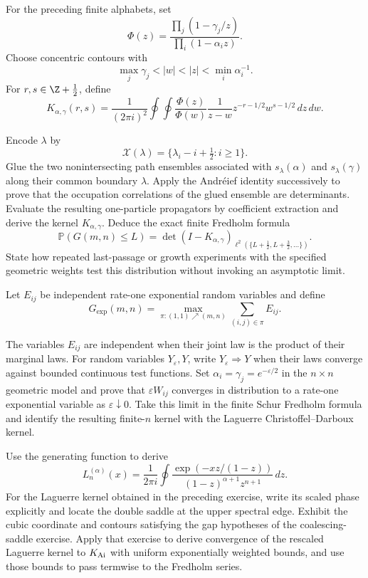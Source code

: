 \begin{exercise}
For the preceding finite alphabets, set
\[
\Phi(z)=\frac{\prod_j(1-\gamma_j/z)}
{\prod_i(1-\alpha_i z)}.
\]
Choose concentric contours with
\[
\max_j\gamma_j<|w|<|z|<\min_i\alpha_i^{-1}.
\]
For $r,s\in\Z+\tfrac12$, define
\[
K_{\alpha,\gamma}(r,s)
=\frac1{(2\pi i)^2}\oint\!\oint
\frac{\Phi(z)}{\Phi(w)}\frac{1}{z-w}
z^{-r-1/2}w^{s-1/2}\,dz\,dw.
\]

Encode $\lambda$ by
\[
\mathcal X(\lambda)
=\{\lambda_i-i+\tfrac12:i\geq1\}.
\]
Glue the two nonintersecting path ensembles associated with
$s_\lambda(\alpha)$ and $s_\lambda(\gamma)$ along their common boundary
$\lambda$.  Apply the Andr\'eief identity successively to prove that the
occupation correlations of the glued ensemble are determinants.  Evaluate
the resulting one-particle propagators by coefficient extraction and derive
the kernel $K_{\alpha,\gamma}$.  Deduce the exact finite Fredholm formula
\[
\mathbb P(G(m,n)\leq L)
=\det(I-K_{\alpha,\gamma})_{
\ell^2(\{L+\tfrac12,L+\tfrac32,\ldots\})}.
\]
State how repeated last-passage or growth experiments with the specified
geometric weights test this distribution without invoking an asymptotic
limit.
\end{exercise}

\begin{exercise}
Let $E_{ij}$ be independent rate-one exponential random variables and define
\[
G_{\exp}(m,n)=\max_{\pi:(1,1)\nearrow(m,n)}
\sum_{(i,j)\in\pi}E_{ij}.
\]

The variables $E_{ij}$ are independent when their joint law is the product
of their marginal laws.
For random variables $Y_\varepsilon,Y$, write $Y_\varepsilon\Longrightarrow Y$
when their laws converge against bounded continuous test functions.
Set $\alpha_i=\gamma_j=e^{-\varepsilon/2}$ in the $n\times n$ geometric
model and prove that $\varepsilon W_{ij}$ converges in distribution to a
rate-one exponential variable as $\varepsilon\downarrow0$.  Take this limit
in the finite Schur Fredholm formula and identify the resulting finite-$n$
kernel with the Laguerre Christoffel--Darboux kernel.
\end{exercise}

\begin{exercise}
Use the generating function to derive
\[
L_n^{(\alpha)}(x)
=\frac1{2\pi i}\oint
\frac{\exp(-xz/(1-z))}{(1-z)^{\alpha+1}z^{n+1}}\,dz.
\]
For the Laguerre kernel obtained in the preceding exercise, write its
scaled phase explicitly and locate the double saddle at the upper spectral
edge.  Exhibit the cubic coordinate and contours satisfying the gap
hypotheses of the coalescing-saddle exercise.  Apply that exercise to
derive convergence of the rescaled Laguerre kernel to $K_{\rm Ai}$ with
uniform exponentially weighted bounds, and use those bounds to pass
termwise to the Fredholm series.
\end{exercise}

